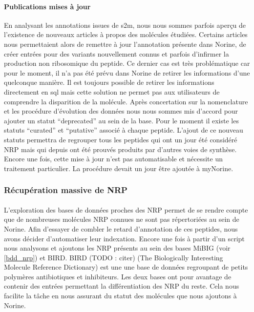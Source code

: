 \documentclass[12pt,french,twoside]{report}
\begin{document}
\paragraph{Publications mises à jour}
En analysant les annotations issues de s2m, nous nous sommes parfois aperçu de l'existence de nouveaux articles à propos des molécules étudiées.
Certains articles nous permettaient alors de remettre à jour l'annotation présente dans Norine, de créer entrées pour des variants nouvellement connus et parfois d'infirmer la production non ribosomique du peptide.
Ce dernier cas est très problématique car pour le moment, il n'a pas été prévu dans Norine de retirer les informations d'une quelconque manière.
Il est toujours possible de retirer les informations directement en sql mais cette solution ne permet pas aux utilisateurs de comprendre la disparition de la molécule.
Après concertation sur la nomenclature et les procédure d'évolution des données nous nous sommes mis d'accord pour ajouter un statut ``deprecated'' au sein de la base.
Pour le moment il existe les statuts ``curated'' et ``putative'' associé à chaque peptide.
L'ajout de ce nouveau statuts permettra de regrouper tous les peptides qui ont un jour été considéré NRP mais qui depuis ont été prouvés produits par d'autres voies de synthèse.
Encore une fois, cette mise à jour n'est pas automatisable et nécessite un traitement particulier.
La procédure devait un jour être ajoutée à myNorine.


\subsubsection{Récupération massive de NRP}

\paragraph{}L'exploration des bases de données proches des NRP permet de se rendre compte que de nombreuses molécules NRP connues ne sont pas répertoriées au sein de Norine.
Afin d'essayer de combler le retard d'annotation de ces peptides, nous avons décider d'automatiser leur indexation.
Encore une fois à partir d'un script nous analysons et ajoutons les NRP présents au sein des bases MiBIG (voir \ref{bdd_nrp}) et BIRD.
BIRD (TODO : citer) (The Biologically Interesting Molecule Reference Dictionary) est une une base de données regroupant de petits polymères antibiotiques et inhibiteurs.
Les deux bases ont pour avantage de contenir des entrées permettant la différentiation des NRP du reste.
Cela nous facilite la tâche en nous assurant du statut des molécules que nous ajoutons à Norine.
\end{document}
